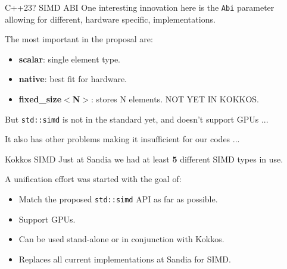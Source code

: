 \begin{frame}[fragile]{C++23? SIMD ABI}
One interesting innovation here is the \texttt{Abi} parameter allowing for different, hardware specific, implementations.

	\vspace{8pt}

The most important in the proposal are:
\begin{itemize}
	\item{\textbf{scalar}: single element type.}
	\item{\textbf{native}: best fit for hardware.}
        \item{\textbf{fixed\_size$<$N$>$}: stores N elements. NOT YET IN KOKKOS.}
\end{itemize}

\pause
	\vspace{8pt}

	But \texttt{std::simd} is not in the standard yet, and doesn't support GPUs ...

	\pause
	\vspace{8pt}
	It also has other problems making it insufficient for our codes ...
\end{frame}

\begin{frame}[fragile]{Kokkos SIMD}
   Just at Sandia we had at least \textbf{5} different SIMD types in use.

   \vspace{8pt}
   A unification effort was started with the goal of:
   \begin{itemize}
      \item{Match the proposed \texttt{std::simd} API as far as possible.}
      \item{Support GPUs.}
      \item{Can be used stand-alone or in conjunction with Kokkos.}
      \item{Replaces all current implementations at Sandia for SIMD.}
   \end{itemize}

\end{frame}

